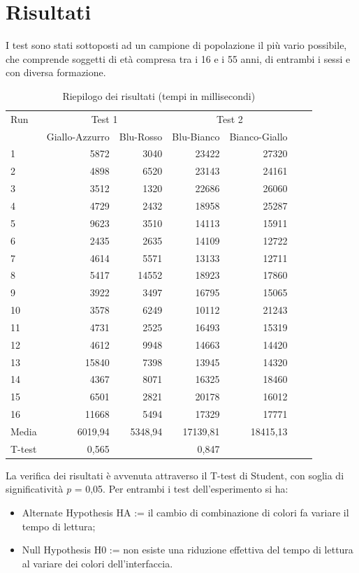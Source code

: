 \documentclass[a4paper]{article}
\begin{document}
\section{Risultati}
 I test sono stati sottoposti ad un campione di popolazione il più vario possibile, che comprende soggetti di età compresa tra i 16 e i 55 anni, di entrambi i sessi e con diversa formazione.
\begin{table}[http]
\centering
\begin{tabular}{lrrrrrr}
\toprule
Run & \multicolumn{2}{c}{Test 1} & \multicolumn{2}{c}{Test 2} \\
& {Giallo-Azzurro} & {Blu-Rosso} & {Blu-Bianco} & {Bianco-Giallo}\\
\midrule
1 & 5872 & 3040 & 23422 & 27320 \\
2 & 4898 & 6520 & 23143 & 24161 \\
3 & 3512 & 1320 & 22686 & 26060 \\
4 & 4729 & 2432 & 18958 & 25287 \\
5 & 9623 & 3510 & 14113 & 15911 \\
6 & 2435 & 2635 & 14109 & 12722 \\
7 & 4614 & 5571 & 13133 & 12711 \\
8 & 5417 & 14552 & 18923 & 17860 \\
9 & 3922 & 3497 & 16795 & 15065 \\
10 & 3578 & 6249 & 10112 & 21243 \\
11 & 4731 & 2525 & 16493 & 15319 \\
12 & 4612 & 9948 & 14663 & 14420 \\
13 & 15840 & 7398 & 13945 & 14320 \\
14 & 4367 & 8071 & 16325 & 18460 \\
15 & 6501 & 2821 & 20178 & 16012 \\
16 & 11668 & 5494 & 17329 & 17771 \\
\midrule
Media & 6019,94 & 5348,94 & 17139,81 & 18415,13 \\
T-test & 0,565 & & 0,847 & \\
\bottomrule

\end{tabular}
\caption{Riepilogo dei risultati (tempi in millisecondi)}
\label{tabella:risultati}
\end{table}

La verifica dei risultati è avvenuta attraverso il T-test di Student, con soglia di significatività \emph{p} = 0,05.
Per entrambi i test dell'esperimento si ha:
\begin{itemize}
\item Alternate Hypothesis HA := il cambio di combinazione di colori fa variare il tempo di lettura;
\item Null Hypothesis H0 := non esiste una riduzione effettiva del tempo di lettura al variare dei colori dell'interfaccia.
\end{itemize}
\end{document}
